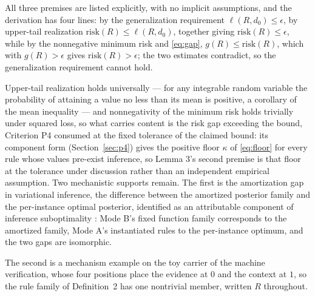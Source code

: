 \argument All three premises are listed explicitly, with no implicit assumptions, and the derivation has four lines: by the generalization requirement $\ell(R, d_0) \le \epsilon$, by upper-tail realization $\mathrm{risk}(R) \le \ell(R, d_0)$, together giving $\mathrm{risk}(R) \le \epsilon$, while by the nonnegative minimum risk and \eqref{eq:gap}, $g(R) \le \mathrm{risk}(R)$, which with $g(R) > \epsilon$ gives $\mathrm{risk}(R) > \epsilon$; the two estimates contradict, so the generalization requirement cannot hold.\qedbox

Upper-tail realization holds universally --- for any integrable random variable the probability of attaining a value no less than its mean is positive, a corollary of the mean inequality --- and nonnegativity of the minimum risk holds trivially under squared loss, so what carries content is the risk gap exceeding the bound, Criterion P4 consumed at the fixed tolerance of the claimed bound: its component form (Section~\ref{sec:p4}) gives the positive floor $\kappa$ of \eqref{eq:floor} for every rule whose values pre-exist inference, so Lemma 3's second premise is that floor at the tolerance under discussion rather than an independent empirical assumption. Two mechanistic supports remain. The first is the amortization gap in variational inference, the difference between the amortized posterior family and the per-instance optimal posterior, identified as an attributable component of inference suboptimality \citep{cremer2018}: Mode B's fixed function family corresponds to the amortized family, Mode A's instantiated rules to the per-instance optimum, and the two gaps are isomorphic.

The second is a mechanism example on the toy carrier of the machine verification, whose four positions place the evidence at $0$ and the context at $1$, so the rule family of Definition~2 has one nontrivial member, written $R$ throughout.

